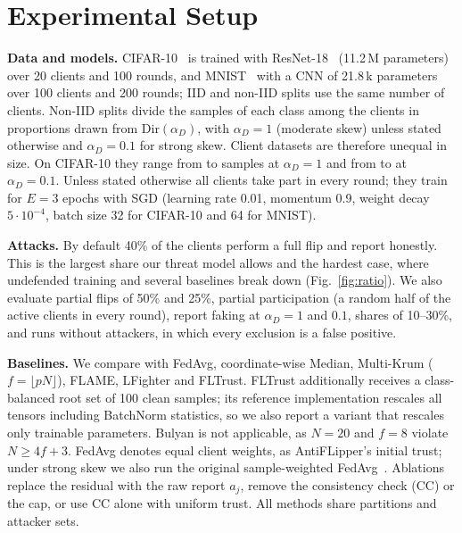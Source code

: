 \documentclass[conference]{IEEEtran}
\begin{document}
\section{Experimental Setup}
\label{sec:setup}
\textbf{Data and models.} CIFAR-10~\cite{CIFAR-krizhevsky2009learning} is trained with ResNet-18~\cite{resnet-he2016deep} (11.2\,M parameters) over 20 clients and 100 rounds, and MNIST~\cite{MNIST-lecun1998gradient} with a CNN of 21.8\,k parameters over 100 clients and 200 rounds; IID and non-IID splits use the same number of clients. Non-IID splits divide the samples of each class among the clients in proportions drawn from $\mathrm{Dir}(\alpha_D)$, with $\alpha_D{=}1$ (moderate skew) unless stated otherwise and $\alpha_D{=}0.1$ for strong skew. Client datasets are therefore unequal in size. On CIFAR-10 they range from \sizeHighMin{} to \sizeHighMax{} samples at $\alpha_D{=}1$ and from \sizeLowMin{} to \sizeLowMax{} at $\alpha_D{=}0.1$. Unless stated otherwise all clients take part in every round; they train for $E{=}3$ epochs with SGD (learning rate 0.01, momentum 0.9, weight decay $5\cdot10^{-4}$, batch size 32 for CIFAR-10 and 64 for MNIST).

\textbf{Attacks.} By default 40\% of the clients perform a full flip and report honestly. This is the largest share our threat model allows and the hardest case, where undefended training and several baselines break down (Fig.~\ref{fig:ratio}). We also evaluate partial flips of 50\% and 25\%, partial participation (a random half of the active clients in every round), report faking at $\alpha_D{=}1$ and $0.1$, shares of 10--30\%, and runs without attackers, in which every exclusion is a false positive.

\textbf{Baselines.} We compare with FedAvg, coordinate-wise Median, Multi-Krum ($f=\lfloor pN\rfloor$), FLAME, LFighter and FLTrust. FLTrust additionally receives a class-balanced root set of 100 clean samples; its reference implementation rescales all tensors including BatchNorm statistics, so we also report a variant that rescales only trainable parameters. Bulyan is not applicable, as $N{=}20$ and $f{=}8$ violate $N\ge4f+3$. FedAvg denotes equal client weights, as AntiFLipper's initial trust; under strong skew we also run the original sample-weighted FedAvg~\cite{fedavg-pmlr-v54-mcmahan17a}. Ablations replace the residual with the raw report $a_j$, remove the consistency check (CC) or the cap, or use CC alone with uniform trust. All methods share partitions and attacker sets.
\end{document}
